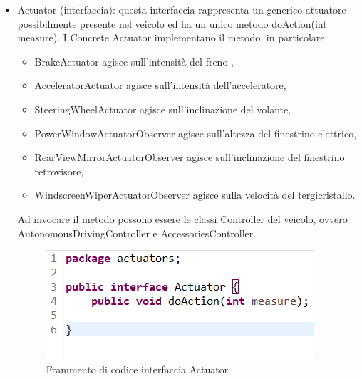 \documentclass{article}
\begin{document}
\begin{itemize}
    
\item Actuator (interfaccia): questa interfaccia rappresenta un generico attuatore possibilmente presente nel veicolo ed ha un unico metodo doAction(int measure). I Concrete Actuator implementano il metodo, in particolare:
    \begin{itemize}
    \item BrakeActuator agisce sull'intensità del freno , 
    \item AcceleratorActuator agisce sull'intensità dell'acceleratore, 
    \item SteeringWheelActuator agisce sull'inclinazione del volante, 
    \item PowerWindowActuatorObserver agisce sull'altezza del finestrino elettrico, 
    \item RearViewMirrorActuatorObserver agisce sull'inclinazione del finestrino retrovisore,  
    \item WindscreenWiperActuatorObserver agisce sulla velocità del tergicristallo. 
    \end{itemize}
Ad invocare il metodo possono essere le classi Controller del veicolo, ovvero AutonomousDrivingController e AccessoriesController.
\begin{figure} [H]
\begin{center}
\includegraphics[scale=0.8]{Actuator.png}
\end{center}
\caption{Frammento di codice interfaccia Actuator}
\end{figure}


\end{itemize}
\end{document}

